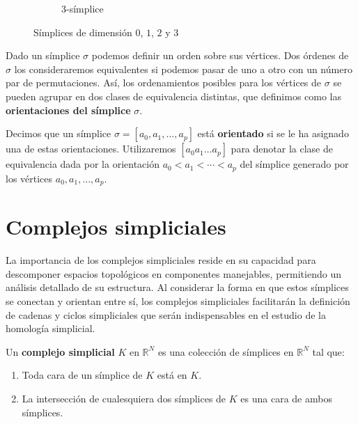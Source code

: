 \begin{figure}[h]
\begin{subfigure}{.24\textwidth}
		\caption{3-símplice}
	\end{subfigure}
	\caption{Símplices de dimensión $0$, $1$, $2$ y $3$}
	\label{fig:simplex}
\end{figure}

Dado un símplice $\sigma$ podemos definir un orden sobre sus vértices. Dos órdenes de $\sigma$ los consideraremos equivalentes si podemos pasar de uno a otro con un número par de permutaciones. Así, los ordenamientos posibles para los vértices de $\sigma$ se pueden agrupar en dos clases de equivalencia distintas, que definimos como las \textbf{orientaciones del símplice} $\sigma$.

\begin{definicion}
Decimos que un símplice $\sigma = [a_0, a_1, \ldots, a_p]$ está \textbf{orientado} si se le ha asignado una de estas orientaciones. Utilizaremos $[a_0 a_1 \ldots a_p]$ para denotar la clase de equivalencia dada por la orientación $a_0 < a_1 < \cdots < a_p$ del símplice generado por los vértices $a_0,a_1,\ldots, a_p$.
\end{definicion}

\section{Complejos simpliciales}

La importancia de los complejos simpliciales reside en su capacidad para descomponer espacios topológicos en componentes manejables, permitiendo un análisis detallado de su estructura. Al considerar la forma en que estos símplices se conectan y orientan entre sí, los complejos simpliciales facilitarán la definición de cadenas y ciclos simpliciales que serán indispensables en el estudio de la homología simplicial.

\begin{definicion}
	Un \textbf{complejo simplicial} $K$ en $\mathbb{R}^N$ es una colección de símplices en $\mathbb{R}^N$
	 tal que:
	\begin{enumerate}
		\item Toda cara de un símplice de $K$ está en $K$.
		\item La intersección de cualesquiera dos símplices de $K$ es una cara 
		de ambos símplices.
	\end{enumerate}
\end{definicion}

